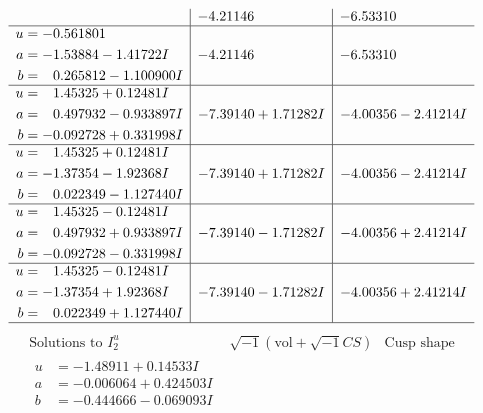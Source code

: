 \documentclass[1p]{elsarticle_modified}
\theoremstyle{definition}
\newcommand{\I}{\sqrt{-1}}
\begin{document}
$$\begin{array}{c|c|c}
 & -4.21146\phantom{ +0.000000I} & -6.53310\phantom{ +0.000000I} \\ \hline\begin{aligned}
u &= -0.561801\phantom{ +0.000000I} \\
a &= -1.53884 - 1.41722 I \\
b &= \phantom{-}0.265812 - 1.100900 I\end{aligned}
 & -4.21146\phantom{ +0.000000I} & -6.53310\phantom{ +0.000000I} \\ \hline\begin{aligned}
u &= \phantom{-}1.45325 + 0.12481 I \\
a &= \phantom{-}0.497932 - 0.933897 I \\
b &= -0.092728 + 0.331998 I\end{aligned}
 & -7.39140 + 1.71282 I & -4.00356 - 2.41214 I \\ \hline\begin{aligned}
u &= \phantom{-}1.45325 + 0.12481 I \\
a &= -1.37354 - 1.92368 I \\
b &= \phantom{-}0.022349 - 1.127440 I\end{aligned}
 & -7.39140 + 1.71282 I & -4.00356 - 2.41214 I \\ \hline\begin{aligned}
u &= \phantom{-}1.45325 - 0.12481 I \\
a &= \phantom{-}0.497932 + 0.933897 I \\
b &= -0.092728 - 0.331998 I\end{aligned}
 & -7.39140 - 1.71282 I & -4.00356 + 2.41214 I \\ \hline\begin{aligned}
u &= \phantom{-}1.45325 - 0.12481 I \\
a &= -1.37354 + 1.92368 I \\
b &= \phantom{-}0.022349 + 1.127440 I\end{aligned}
 & -7.39140 - 1.71282 I & -4.00356 + 2.41214 I\\
 \hline 
 \end{array}$$\newpage$$\begin{array}{c|c|c}  
\text{Solutions to }I^u_{2}& \I (\text{vol} + \sqrt{-1}CS) & \text{Cusp shape}\\
 \hline 
\begin{aligned}
u &= -1.48911 + 0.14533 I \\
a &= -0.006064 + 0.424503 I \\
b &= -0.444666 - 0.069093 I\end{aligned}

\end{array}$$
\end{document}
